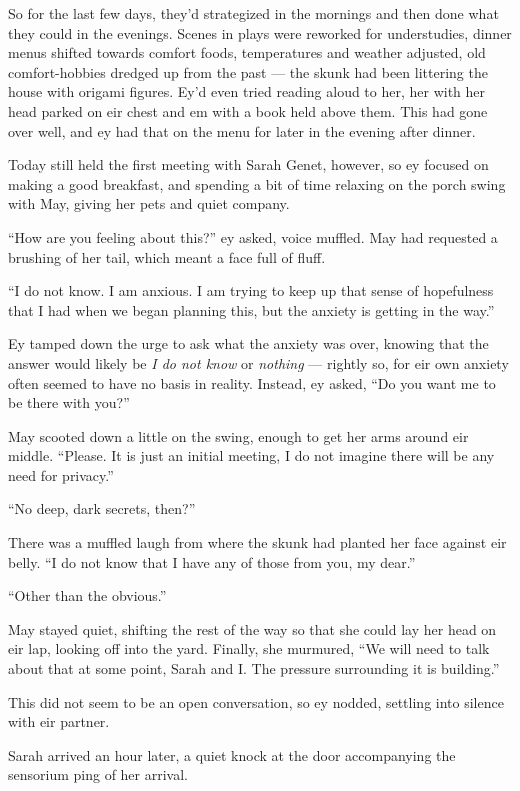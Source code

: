 So for the last few days, they'd strategized in the mornings and then done what they could in the evenings. Scenes in plays were reworked for understudies, dinner menus shifted towards comfort foods, temperatures and weather adjusted, old comfort-hobbies dredged up from the past — the skunk had been littering the house with origami figures. Ey'd even tried reading aloud to her, her with her head parked on eir chest and em with a book held above them. This had gone over well, and ey had that on the menu for later in the evening after dinner.

Today still held the first meeting with Sarah Genet, however, so ey focused on making a good breakfast, and spending a bit of time relaxing on the porch swing with May, giving her pets and quiet company.

``How are you feeling about this?'' ey asked, voice muffled. May had requested a brushing of her tail, which meant a face full of fluff.

``I do not know. I am anxious. I am trying to keep up that sense of hopefulness that I had when we began planning this, but the anxiety is getting in the way.''

Ey tamped down the urge to ask what the anxiety was over, knowing that the answer would likely be \emph{I do not know} or \emph{nothing} — rightly so, for eir own anxiety often seemed to have no basis in reality. Instead, ey asked, ``Do you want me to be there with you?''

May scooted down a little on the swing, enough to get her arms around eir middle. ``Please. It is just an initial meeting, I do not imagine there will be any need for privacy.''

``No deep, dark secrets, then?''

There was a muffled laugh from where the skunk had planted her face against eir belly. ``I do not know that I have any of those from you, my dear.''

``Other than the obvious.''

May stayed quiet, shifting the rest of the way so that she could lay her head on eir lap, looking off into the yard. Finally, she murmured, ``We will need to talk about that at some point, Sarah and I. The pressure surrounding it is building.''

This did not seem to be an open conversation, so ey nodded, settling into silence with eir partner.

Sarah arrived an hour later, a quiet knock at the door accompanying the sensorium ping of her arrival.

